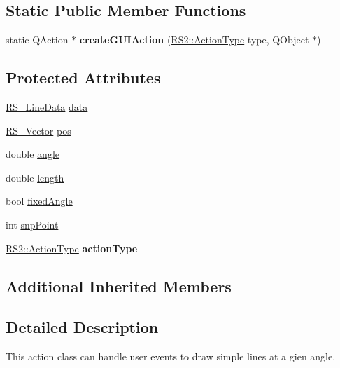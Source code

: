 \subsection*{Static Public Member Functions}
\begin{DoxyCompactItemize}
\item 
\hypertarget{classRS__ActionDrawLineAngle_aac5c093cb04f32836f2e867f9f6ec55e}{static Q\-Action $\ast$ {\bfseries create\-G\-U\-I\-Action} (\hyperlink{classRS2_afe3523e0bc41fd637b892321cfc4b9d7}{R\-S2\-::\-Action\-Type} type, Q\-Object $\ast$)}\label{classRS__ActionDrawLineAngle_aac5c093cb04f32836f2e867f9f6ec55e}

\end{DoxyCompactItemize}
\subsection*{Protected Attributes}
\begin{DoxyCompactItemize}
\item 
\hyperlink{classRS__LineData}{R\-S\-\_\-\-Line\-Data} \hyperlink{classRS__ActionDrawLineAngle_a3b25308dde7f93c13e5a1a5b19219440}{data}
\item 
\hyperlink{classRS__Vector}{R\-S\-\_\-\-Vector} \hyperlink{classRS__ActionDrawLineAngle_a46ffce9f47c6772dfaa1230cfb10561c}{pos}
\item 
double \hyperlink{classRS__ActionDrawLineAngle_a52b9926296010039d78a056e4c3408cc}{angle}
\item 
double \hyperlink{classRS__ActionDrawLineAngle_a35c40febb8773592c14b649bd666769e}{length}
\item 
bool \hyperlink{classRS__ActionDrawLineAngle_a55aac1522eca70558ac4136f06dc3a82}{fixed\-Angle}
\item 
int \hyperlink{classRS__ActionDrawLineAngle_a5e65648db0c571ea70c8afb58e7ddef5}{snp\-Point}
\item 
\hypertarget{classRS__ActionDrawLineAngle_af7184026e4e37fbc4b1e006aa85e4ebf}{\hyperlink{classRS2_afe3523e0bc41fd637b892321cfc4b9d7}{R\-S2\-::\-Action\-Type} {\bfseries action\-Type}}\label{classRS__ActionDrawLineAngle_af7184026e4e37fbc4b1e006aa85e4ebf}

\end{DoxyCompactItemize}
\subsection*{Additional Inherited Members}


\subsection{Detailed Description}
This action class can handle user events to draw simple lines at a gien angle.

